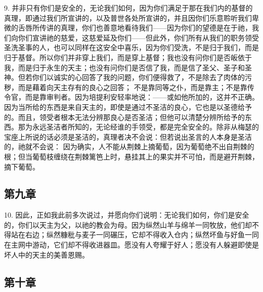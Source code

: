 9. 并非只有你们是安全的，无论我们如何，因为你们满足于那在我们内的基督的真理，即通过我们所宣讲的，以及普世各处所宣讲的，并且因你们乐意聆听我们卑微的舌唇所传讲的真理，你们也善意地看待我们——因为你们的望德是在于祂，我们向你们宣讲祂的慈爱，这慈爱延及你们——但此外，你们所有从我们的职务领受圣洗圣事的人，也可以同样在这安全中喜乐，因为你们受洗，不是归于我们，而是归于基督。所以你们并非穿上我们，而是穿上基督；我也没有问你们是否皈依于我，而是归于永生的天主；也没有问你们是否信了我，而是信了圣父、圣子和圣神。但若你们以诚实的心回答了我的问题，你们便得救了，不是除去了肉体的污秽，而是藉着向天主存有的良心之回答； 不是靠同等之仆，而是靠主；不是靠传令官，而是靠审判者。因为培提利安轻率地说：——或如他所加的，这并不正确。因为当所给的东西是来自天主的，即使是通过不圣洁的良心，它也是以圣德给予的。而且，领受者根本无法分辨那良心是否圣洁；但他可以清楚分辨所给予的东西。那为永远圣洁者所知的，无论经谁的手领受，都是完全安全的。除非从梅瑟的宝座上所说的话必须是圣洁的，真理者决不会说：但若说出圣言的人本身是圣洁的，祂就不会说： 因为确实，人不能从荆棘上摘葡萄，因为葡萄绝不出自荆棘的根；但当葡萄枝缠绕在荆棘篱笆上时，悬挂其上的果实并不可怕，而是避开荆棘，摘下葡萄。\par


\subsection{第九章}

10. 因此，正如我此前多次说过，并愿向你们说明：无论我们如何，你们是安全的，你们以天主为父，以祂的教会为母。因为纵然山羊与绵羊一同牧放，他们却不得站在右边；纵然糠秕与麦子一同碾压，它却不得收入仓内；纵然坏鱼与好鱼一同在主网中游动，它们却不得收进器皿。愿没有人夸耀于好人；愿没有人躲避即使是坏人中的天主的美善恩赐。\par


\subsection{第十章}

